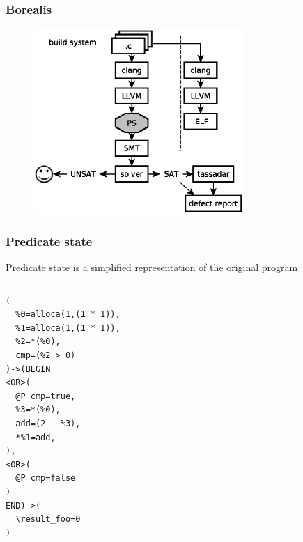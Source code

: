\begin{frame}
	\frametitle{Borealis}
	
	\begin{figure}
	\includegraphics[width=80mm]{image/BorealisOverview}
	\end{figure}	
	
\end{frame}



\begin{frame}[fragile]
	\frametitle{Predicate state}
	
	\begin{block}{}
	Predicate state is a simplified representation of the original program
	\end{block}
	
	\begin{columns}
	\begin{lstlisting}[language=PS, frame=single]
(
  %0=alloca(1,(1 * 1)),
  %1=alloca(1,(1 * 1)),
  %2=*(%0),
  cmp=(%2 > 0)
)->(BEGIN
<OR>(
  @P cmp=true,
  %3=*(%0),
  add=(2 - %3),
  *%1=add,
),
<OR>(
  @P cmp=false
)
END)->(
  \result_foo=0
)
	\end{lstlisting}
	
	\end{columns}
	
\end{frame}


